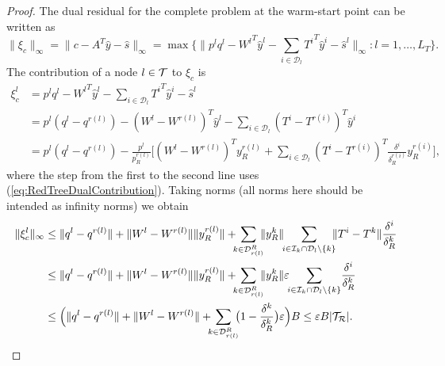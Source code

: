 \begin{proof}
The dual residual for the complete problem at the warm-start point 
can be written as
\[
  \|\xi_c\|_\infty = \|c -A^T\hat y -\hat s \|_\infty 
                   = \max\{\|p^{l}q^{l}
                   - {W^{l}}^T\hat y^{l} 
                   - \sum_{i \in \mathcal{D}_{l}} {T^{i}}^T\hat y^{i}
                   - \hat s^{l}
  \|_\infty : l = 1,\ldots,L_T\}.
\]
%
The contribution of a node $l \in \mathcal{T}$ to $\xi_c$ is
\[
\begin{split}
  \xi_c^{l} 
 & = p^{l} q^{l} - {W^{l}}^T\hat y^{l}
     - \sum_{i\in \mathcal{D}_{l}} {T^i}^T \!\hat y^{i} -\hat s^{l} \\
 & = p^{l}(q^{l}\!-\! q^{r(l)})
     - (W^{l} \!-\! W^{r(l)})^T \hat y^{l}
     -\sum_{i \in \mathcal{D}_{l}} (T^{i} \!-\! T^{r(i)})^T\hat y^i \\
 & = p^{l}(q^{l} \!-\! q^{r(l)})
     - \frac{p^{l}}{p^{r(l)}_R} \Big[
       (W^{l} \!-\! W^{r(l)})^T y^{r(l)}_R
       +\sum_{i\in \mathcal{D}_{l}} %
           (T^{i} \!-\! T^{r(i)})^T 
           \frac{\delta^i}{\delta^{r(i)}_R} y^{r(i)}_R \Big],
\end{split}
\]
where the step from the first to the second line uses 
(\ref{eq:RedTreeDualContribution}).
%
Taking norms (all norms here should be intended as infinity norms)
we obtain
\[
\begin{split}
  \| \xi_c^{l} \|_\infty
  & \le \|q^{l} - q^{r(l)}\| 
        + \|W^{l} - W^{r(l)}\| \| y^{r(l)}_R\|
        + \!\!\! \sum_{k\in \mathcal{D}_{r(l)}^R} \!\!\! \| y^{k}_R \| \!\!
          \sum_{i\in \mathcal{I}_k \cap \mathcal{D}_{l}\setminus \{k\} }
	  \!\!\! \| T^{i} - T^{k} \| \frac{\delta^i}{\delta_R^k} \\
  & \le \|q^{l} - q^{r(l)}\| 
        + \|W^{l} - W^{r(l)}\| \| y^{r(l)}_R\|
        + \!\!\! \sum_{k\in \mathcal{D}_{r(l)}^R} \!\!\! \| y^{k}_R \|
          \varepsilon \!\!
          \sum_{i\in \mathcal{I}_k \cap \mathcal{D}_{l}\setminus \{k\} }
	  \! \frac{\delta^i}{\delta_R^k} \\
  & \le \Big( \|q^{l} - q^{r(l)}\| 
        + \|W^{l} - W^{r(l)}\|
        + \!\!\! \sum_{k\in \mathcal{D}_{r(l)}^R} \!\!\!
	  \big( 1 - \frac{\delta^k}{\delta_R^k} \big) \varepsilon \Big) B
    \le \varepsilon B |\Rtree|.
        \qedhere
\end{split}
\]
%
\end{proof}

